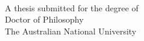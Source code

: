 
\begin{titlepage}
  \enlargethispage{2cm}
  \begin{center}
    \makeatletter
    \Huge\textbf{\@title} \\[.4cm]
    \Huge\textbf{\thesisqualifier} \\[2.5cm]
    \huge\textbf{\@author} \\[9cm]
    \makeatother
    A thesis submitted for the degree of \\
    Doctor of Philosophy \\
    The Australian National University \\[2cm]
    \thismonth
  \end{center}
\end{titlepage}
